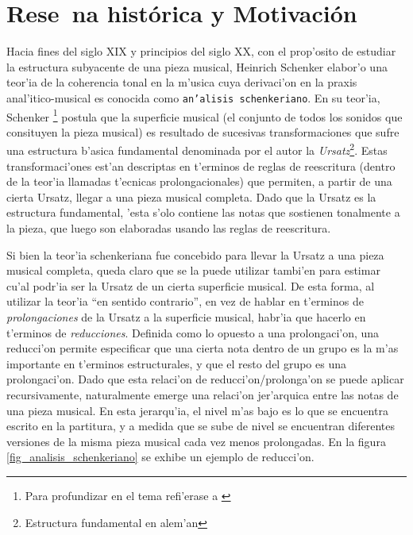 \section{Rese~na hist\'orica y Motivaci\'on}
Hacia fines del siglo XIX y principios del siglo XX, con el prop'osito de estudiar la estructura subyacente de una pieza musical, 
Heinrich Schenker elabor'o una teor'ia de la coherencia tonal en la m'usica cuya derivaci'on en la praxis anal'itico-musical es conocida 
como \texttt{an'alisis schenkeriano}.
En su teor'ia, Schenker \footnote{Para profundizar en el tema refi'erase a \cite{forte03}} postula que la superficie musical 
(el conjunto de todos los sonidos que consituyen la pieza musical) es resultado de sucesivas transformaciones que sufre una estructura b'asica fundamental 
denominada por el autor la \emph{Ursatz}\footnote{Estructura fundamental en alem'an}. Estas transformaci'ones est'an descriptas en t'erminos de reglas de 
reescritura (dentro de la teor'ia llamadas t'ecnicas prolongacionales) que permiten, a partir de una cierta Ursatz, llegar a una pieza musical completa. 
Dado que la Ursatz es la estructura fundamental, 'esta s'olo contiene las notas que sostienen tonalmente a la pieza, que luego son elaboradas usando 
las reglas de reescritura.

Si bien la teor'ia schenkeriana fue concebido para llevar la Ursatz a una pieza musical completa, queda claro que se la puede utilizar tambi'en para estimar
cu'al podr'ia ser la Ursatz de un cierta superficie musical. De esta forma, al utilizar la teor'ia ``en sentido contrario'', en vez de hablar en t'erminos 
de \emph{prolongaciones} de la Ursatz a la superficie musical, habr'ia que hacerlo en t'erminos de \emph{reducciones}. Definida como lo opuesto a 
una prolongaci'on, una reducci'on permite especificar que una cierta nota dentro de un grupo es la m'as importante en t'erminos estructurales, 
y que el resto del grupo es una prolongaci'on.  Dado que esta relaci'on de reducci'on/prolonga'on se puede aplicar recursivamente, naturalmente emerge 
una relaci'on jer'arquica entre las notas de una pieza musical.  En esta jerarqu'ia, el nivel m'as bajo es lo que se encuentra escrito en la 
partitura, y a medida que se sube de nivel se encuentran diferentes versiones de la misma pieza musical cada vez menos prolongadas. En la figura 
\ref{fig_analisis_schenkeriano} se exhibe un ejemplo de reducci'on.


\begin{imagen}
\end{imagen}




